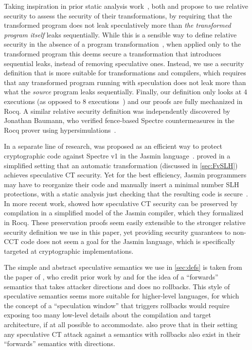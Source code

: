 Taking inspiration in prior static analysis work~\cite{CheangRSS19,
  GuarnieriKMRS20}, both \citet{PatrignaniG21} and \citet{ZhangBCSY23} propose
to use relative security to assess the security of their transformations, by
requiring that the transformed program does not leak speculatively more than
{\em the transformed program itself} leaks sequentially.
%
While this is a sensible way to define relative security in the absence of a
program transformation~\cite{CheangRSS19, GuarnieriKMRS20, DongolGPW24,
  CauligiDMBS22},
%
when applied only to the transformed program this deems secure a transformation
that introduces sequential leaks, instead of removing speculative ones.
%
Instead, we use a security definition that is more suitable for transformations
and compilers, which requires that any transformed program running with
speculation does not leak more than what the {\em source} program leaks sequentially.
%
Finally, our definition only looks at 4 executions (as opposed to 8
executions~\cite{PatrignaniG21}) and our proofs are fully mechanized in Rocq.
%
\ifanon\else
A similar relative security definition was independently discovered by
Jonathan Baumann, who verified fence-based Spectre countermeasures in the Rocq
prover using hypersimulations~\cite{Baumann23}.
\fi

In a separate line of research, \SelvSLH was proposed as an efficient way to
protect cryptographic code against Spectre v1 in the Jasmin
language~\cite{AlmeidaBBBGLOPS17}.
%
\citet{ShivakumarBBCCGOSSY23} proved in a simplified setting that an automatic
\SelvSLH transformation (discussed in \autoref{sec:FvSLH}) achieves speculative
CT security.
%
Yet for the best efficiency, Jasmin programmers may have to reorganize their code
and manually insert a minimal number SLH protections, with a static analysis
just checking that the resulting code is secure~\cite{ShivakumarBGLOPST23}.
%
In more recent work, \citet{OlmosBBGL24} showed how speculative CT security can
be preserved by compilation in a simplified model of the Jasmin compiler, which
they formalized in Rocq.
%
These preservation proofs seem easily extensible to the stronger relative
security definition we use in this paper, yet providing security guarantees to
non-CCT code does not seem a goal for the Jasmin language, which is specifically
targeted at cryptographic implementations.

The simple and abstract speculative semantics we use in \autoref{sec:defs} is
taken from the paper of \citet{ShivakumarBBCCGOSSY23}, who credit prior work by
\citet{CauligiDGTSRB20} and \citet{BartheCGKLOPRS21} for the idea of a
``forwards'' semantics that takes attacker directions and does no rollbacks.
%
This style of speculative semantics seems more suitable for higher-level
languages, for which the concept of a ``speculation window'' that triggers
rollbacks would require exposing too many low-level details about the
compilation and target architecture, if at all possible to accommodate.
%
\citet{BartheCGKLOPRS21} also prove that in their setting any speculative CT
attack against a semantics with rollbacks also exist in their ``forwards''
semantics with directions.